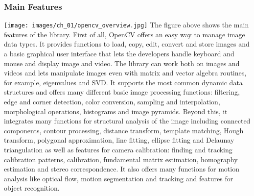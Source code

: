 	\subsubsection*{Main Features}
		\texttt{[image: images/ch\_01/opencv\_overview.jpg]}
	The figure above shows the main features of the library. First of all, OpenCV offers an easy way to manage image data types. It provides functions to load, copy, edit, convert and store images and a basic graphical user interface that lets the developers handle keyboard and mouse and display image and video. The library can work both on images and videos and lets manipulate images even with matrix and vector algebra routines, for example, eigenvalues and SVD. It supports the most common dynamic data structures and offers many different basic image processing functions: filtering, edge and corner detection, color conversion, sampling and interpolation, morphological operations, histograms and image pyramids. Beyond this, it integrates many functions for structural analysis of the image including connected components, contour processing, distance transform, template matching, Hough transform, polygonal approximation, line fitting, ellipse fitting and Delaunay triangulation as well as features for camera calibration: finding and tracking calibration patterns, calibration, fundamental matrix estimation, homography estimation and stereo correspondence. It also offers many functions for motion analysis like optical flow, motion segmentation and tracking and features for object recognition.